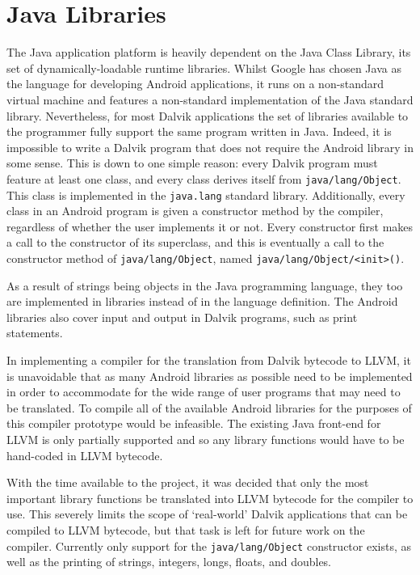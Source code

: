 \section {Java Libraries}
\label{sec:javalib}

The Java application platform is heavily dependent on the Java Class Library, its set of dynamically-loadable runtime libraries. Whilst Google has chosen Java as the language for developing Android applications, it runs on a non-standard virtual machine and features a non-standard implementation of the Java standard library. Nevertheless, for most Dalvik applications the set of libraries available to the programmer fully support the same program written in Java. Indeed, it is impossible to write a Dalvik program that does not require the Android library in some sense. This is down to one simple reason: every Dalvik program must feature at least one class, and every class derives itself from \verb|java/lang/Object|. This class is implemented in the \verb|java.lang| standard library. Additionally, every class in an Android program is given a constructor method by the compiler, regardless of whether the user implements it or not. Every constructor first makes a call to the constructor of its superclass, and this is eventually a call to the constructor method of \verb|java/lang/Object|, named \verb|java/lang/Object/<init>()|.

As a result of strings being objects in the Java programming language, they too are implemented in libraries instead of in the language definition. The Android libraries also cover input and output in Dalvik programs, such as print statements.

In implementing a compiler for the translation from Dalvik bytecode to LLVM, it is unavoidable that as many Android libraries as possible need to be implemented in order to accommodate for the wide range of user programs that may need to be translated. To compile all of the available Android libraries for the purposes of this compiler prototype would be infeasible. The existing Java front-end for LLVM is only partially supported and so any library functions would have to be hand-coded in LLVM bytecode.

With the time available to the project, it was decided that only the most important library functions be translated into LLVM bytecode for the compiler to use. This severely limits the scope of `real-world' Dalvik applications that can be compiled to LLVM bytecode, but that task is left for future work on the compiler. Currently only support for the \verb|java/lang/Object| constructor exists, as well as the printing of strings, integers, longs, floats, and doubles.

